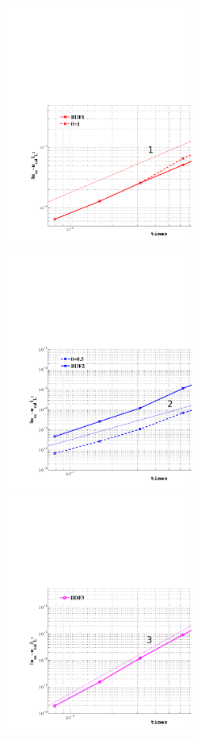 \documentclass[english,a4paper]{article}
\begin{document}
\begin{figure}[!h]
\includegraphics[width=6.25cm, height=8cm]{figures/P11_order1.pdf}
\includegraphics[width=6.25cm, height=8cm]{figures/P11_order2.pdf}\\
\includegraphics[width=6.25cm, height=8cm]{figures/P11_order3.pdf}

\end{figure}
\end{document}
